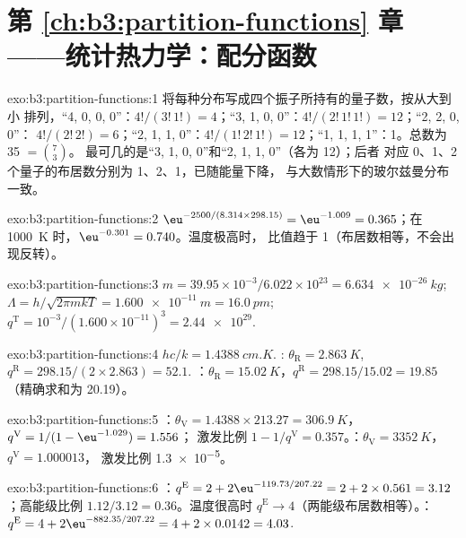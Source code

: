 \section*{第 \ref{ch:b3:partition-functions} 章——统计热力学：配分函数}

\begin{solution}{exo:b3:partition-functions:1}
将每种分布写成四个振子所持有的量子数，按从大到小
排列，“4, 0, 0, 0”：$4!/(3!\,1!) = 4$；“3, 1, 0, 0”：$4!/(2!\,1!\,1!) = 12$；“2, 2, 0, 0”：
$4!/(2!\,2!) = 6$；“2, 1, 1, 0”：$4!/(1!\,2!\,1!) = 12$；“1, 1, 1, 1”：1。总数为 35 $= \binom73$。
最可几的是“3, 1, 0, 0”和“2, 1, 1, 0”（各为 12）；后者
对应 0、1、2 个量子的布居数分别为 1、2、1，已随能量下降，
与大数情形下的玻尔兹曼分布一致。
\end{solution}

\begin{solution}{exo:b3:partition-functions:2}
$\eu^{-2500/(8.314 \times 298.15)} = \eu^{-1.009} = 0.365$；在 \qty{1000}{K} 时，$\eu^{-0.301} = 0.740$。温度极高时，
比值趋于 1（布居数相等，不会出现反转）。
\end{solution}

\begin{solution}{exo:b3:partition-functions:3}
$m = 39.95\times10^{-3}/6.022\times10^{23} = \qty{6.634e-26}{kg}$; $\Lambda = h/\sqrt{2\pi mkT} =
\qty{1.600e-11}{m} = \qty{16.0}{pm}$; $q^{\mathrm T} = 10^{-3}/(1.600\times10^{-11})^3 = \num{2.44e29}$.
\end{solution}

\begin{solution}{exo:b3:partition-functions:4}
$hc/k = \qty{1.4388}{cm.K}$. : $\theta_{\mathrm R} = \qty{2.863}{K}$, $q^{\mathrm R} = 298.15/(2 \times 2.863) = 52.1$.
：$\theta_{\mathrm R} = \qty{15.02}{K}$，$q^{\mathrm R} = 298.15/15.02 = 19.85$（精确求和为 20.19）。
\end{solution}

\begin{solution}{exo:b3:partition-functions:5}
：$\theta_{\mathrm V} = 1.4388 \times 213.27 = \qty{306.9}{K}$，$q^{\mathrm V} = 1/(1 - \eu^{-1.029}) = 1.556$；
激发比例 $1 - 1/q^{\mathrm V} = 0.357$。：$\theta_{\mathrm V} = \qty{3352}{K}$，$q^{\mathrm V} = 1.000013$，
激发比例 \num{1.3e-5}。
\end{solution}

\begin{solution}{exo:b3:partition-functions:6}
：$q^{\mathrm E} = 2 + 2\eu^{-119.73/207.22} = 2 + 2 \times 0.561 = 3.12$；高能级比例 $1.12/3.12
= 0.36$。温度很高时 $q^{\mathrm E} \to 4$（两能级布居数相等）。：
$q^{\mathrm E} = 4 + 2\eu^{-882.35/207.22} = 4 + 2 \times 0.0142 = 4.03$.
\end{solution}

